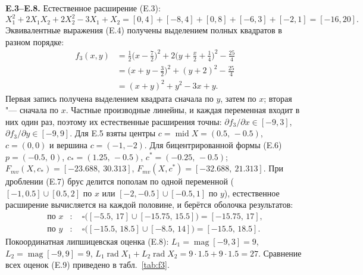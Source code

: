 \documentclass[12pt,a4paper]{article}
\newcommand{\rad}{\operatorname{rad}}
\newcommand{\Mid}{\operatorname{mid}}
\newcommand{\Mag}{\operatorname{mag}}
\begin{document}
\textbf{E.3--E.8.} Естественное расширение (E.3):
\[
X_1^2+2X_1X_2+2X_2^2-3X_1+X_2=[0,4]+[-8,4]+[0,8]+[-6,3]+[-2,1]=[-16,20].
\]
Эквивалентные выражения (E.4) получены выделением полных квадратов в разном порядке:
\begin{align*}
f_3(x,y)&=\tfrac12\bigl(x-\tfrac72\bigr)^2+2\bigl(y+\tfrac x2+\tfrac14\bigr)^2-\tfrac{25}{4}\\
&=\bigl(x+y-\tfrac32\bigr)^2+(y+2)^2-\tfrac{25}{4}\\
&=(x+y)^2+y^2-3x+y.
\end{align*}
Первая запись получена выделением квадрата сначала по $y$, затем по $x$; вторая "--- сначала по $x$. Частные производные линейны, и каждая переменная входит в них один раз, поэтому их естественные расширения точны: $\partial f_3/\partial x\in[-9,3]$, $\partial f_3/\partial y\in[-9,9]$. Для E.5 взяты центры $c=\Mid X=(0.5,\,-0.5)$, $c=(0,0)$ и вершина $c=(-1,-2)$. Для бицентрированной формы (E.6) $p=(-0.5,\ 0)$, $c_{*}=(1.25,\,-0.5)$, $c^{*}=(-0.25,\,-0.5)$; $F_{mv}(X,c_{*})=[-23.688,\ 30.313]$, $F_{mv}(X,c^{*})=[-32.688,\ 21.313]$. При дроблении (E.7) брус делится пополам по одной переменной ($[-1,0.5]\cup[0.5,2]$ по $x$ или $[-2,-0.5]\cup[-0.5,1]$ по $y$), естественное расширение вычисляется на каждой половине, и берётся оболочка результатов:
\begin{align*}
\text{по } x&:\quad \square\bigl([-5.5,\,17]\cup[-15.75,\,15.5]\bigr)=[-15.75,\,17],\\
\text{по } y&:\quad \square\bigl([-15.5,\,18.5]\cup[-8.5,\,14]\bigr)=[-15.5,\,18.5].
\end{align*}
Покоординатная липшицевская оценка (E.8): $L_1=\Mag[-9,3]=9$, $L_2=\Mag[-9,9]=9$, $L_1\rad X_1+L_2\rad X_2=9\cdot1.5+9\cdot1.5=27$. Сравнение всех оценок (E.9) приведено в табл.~\ref{tab:f3}.
\end{document}
